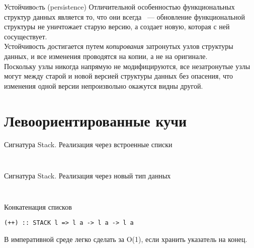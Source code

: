 \begin{frame}[fragile]{Устойчивоcть (persistence)}
Отличительной особенностью функциональных структур данных является то,
что они всегда ~--- обновление
функциональной структуры не уничтожает старую версию, а создает
новую, которая с ней сосуществует. \\

Устойчивость достигается путем
\emph{копирования} затронутых узлов структуры данных, и все изменения
проводятся на копии, а не на оригинале. \\

Поскольку узлы никогда
напрямую не модифицируются, все незатронутые узлы могут
 между старой и новой версией структуры
данных без опасения, что изменения одной версии непроизвольно окажутся
видны другой.

\end{frame}


\section{Левоориентированные кучи}
\label{sc:3.1}

\begin{frame}[fragile]{Сигнатура Stack. Реализация через встроенные списки}
\begin{minipage}{.48\textwidth}
\inputminted[firstline=10,lastline=15]{haskell}{code/Stacks.hs}
\end{minipage}
\begin{minipage}{.48\textwidth}
\inputminted{haskell}{code/ListStack.hs}
\end{minipage}
\end{frame}

\begin{frame}[fragile]{Сигнатура Stack. Реализация через новый тип данных}
\begin{minipage}{.48\textwidth}
  \inputminted[firstline=10,lastline=15]{haskell}{code/Stacks.hs}
\end{minipage}
\begin{minipage}{.48\textwidth}
  \inputminted{haskell}{code/CustomStack.hs}
\end{minipage}
\end{frame}

\begin{frame}[fragile]{Конкатенация списков}
\begin{verbatim}
(++) :: STACK l => l a -> l a -> l a
\end{verbatim}
В императивной среде легко сделать за O(1), если хранить указатель на конец.
\end{frame}

